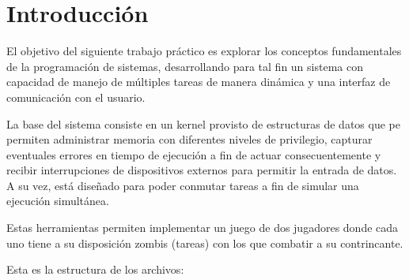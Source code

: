 \documentclass[a4paper]{article}
\begin{document}
\thispagestyle{empty}

\maketitle
\newpage

\thispagestyle{empty}
\vfill
\begin{abstract}

\end{abstract}

\thispagestyle{empty}
\vspace{3cm}
\tableofcontents
\newpage


\newpage



\section{Introducción}
El objetivo del siguiente trabajo práctico es explorar los conceptos fundamentales de la programación de sistemas, desarrollando para tal fin un sistema con capacidad de manejo de múltiples tareas de manera dinámica y una interfaz de comunicación con el usuario. 

La base del sistema consiste en un kernel provisto de estructuras de datos que pe permiten administrar memoria con diferentes niveles de privilegio, capturar eventuales errores en tiempo de ejecución a fin de actuar consecuentemente y recibir interrupciones de dispositivos externos para permitir la entrada de datos. A su vez, está diseñado para poder conmutar tareas a fin de simular una ejecución simultánea.

Estas herramientas permiten implementar un juego de dos jugadores donde cada uno tiene a su disposición zombis (tareas) con los que combatir a su contrincante.

Esta es la estructura de los archivos:
\end{document}
